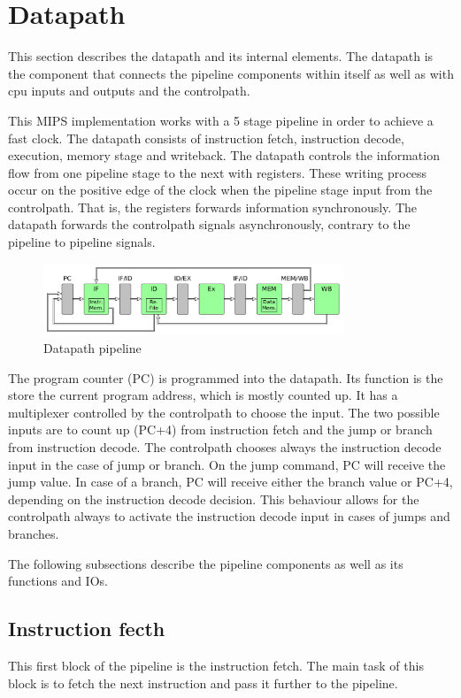 \section{Datapath}
This section describes the datapath and its internal elements. The datapath is the component that connects the pipeline components within itself as well as with cpu inputs and outputs and the controlpath.

This MIPS implementation works with a 5 stage pipeline in order to achieve a fast clock. The datapath consists of instruction fetch, instruction decode, execution, memory stage and writeback.
The datapath controls the information flow from one pipeline stage to the next with registers. 
These writing process occur on the positive edge of the clock when the pipeline stage input from the controlpath. That is, the registers forwards information synchronously. 
The datapath forwards the controlpath signals asynchronously, contrary to the pipeline to pipeline signals.



\begin{figure}
  \centering
  \includegraphics[width=0.8\textwidth]{figure/datapath.png}
  \caption{Datapath pipeline}
  \label{fig:datapath}
\end{figure}

The program counter (PC) is programmed into the datapath. Its function is the store the current program address, which is mostly counted up.
It has a multiplexer controlled by the controlpath to choose the input. The two possible inputs are to count up (PC+4) from instruction fetch
and the jump or branch from instruction decode. The controlpath chooses always the instruction decode input in the case of jump or branch. 
On the jump command, PC will receive the jump value. In case of a branch, PC will receive either the branch value or PC+4, 
depending on the instruction decode decision. This behaviour allows for the controlpath always to 
activate the instruction decode input in cases of jumps and branches.

The following subsections describe the pipeline components as well as its functions and IOs. 

\subsection{Instruction fecth}
This first block of the pipeline is the instruction fetch. The main task of this block is to fetch the next instruction and pass it further to the pipeline. 

